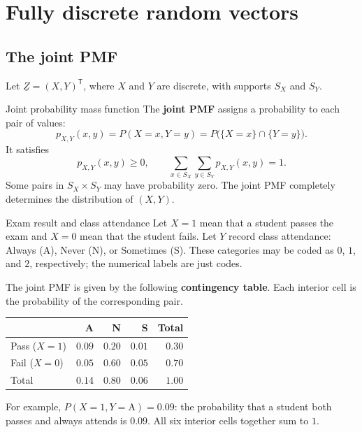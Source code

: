 \documentclass[a4paper,12pt,oneside]{report}
\begin{document}
\clearpage
\section{Fully discrete random vectors}
\label{sec:fully-discrete-random-vectors}

\subsection{The joint PMF}
\label{sec:joint-pmf}

Let $\underline{Z}=(X,Y)^{\mathsf T}$, where $X$ and $Y$ are discrete,
with supports $S_X$ and $S_Y$.

\begin{frameddefn}{Joint probability mass function}
The \textbf{joint PMF} assigns a probability to each pair of values:
\[
  p_{X,Y}(x,y)=P(X=x,Y=y)
    =P\bigl(\{X=x\}\cap\{Y=y\}\bigr).
\]
It satisfies
\[
  p_{X,Y}(x,y)\geq0,
  \qquad
  \sum_{x\in S_X}\sum_{y\in S_Y}p_{X,Y}(x,y)=1.
\]
Some pairs in $S_X\times S_Y$ may have probability zero.
The joint PMF completely determines the distribution of $(X,Y)$.
\end{frameddefn}

\begin{framedexample}{Exam result and class attendance}
Let $X=1$ mean that a student passes the exam and $X=0$ mean
that the student fails. Let $Y$ record class attendance:
Always (A), Never (N), or Sometimes (S).
These categories may be coded as $0$, $1$, and $2$, respectively;
the numerical labels are just codes.

The joint PMF is given by the following \textbf{contingency table}.
Each interior cell is the probability of the corresponding pair.
\begin{center}
\begin{tabular}{lrrrr}
\toprule
 & A & N & S & Total\\
\midrule
Pass ($X=1$) & $0.09$ & $0.20$ & $0.01$ & $0.30$\\
Fail ($X=0$) & $0.05$ & $0.60$ & $0.05$ & $0.70$\\
\midrule
Total & $0.14$ & $0.80$ & $0.06$ & $1.00$\\
\bottomrule
\end{tabular}
\end{center}
For example, $P(X=1,Y=\mathrm A)=0.09$: the probability that
a student both passes and always attends is $0.09$.
All six interior cells together sum to $1$.
\end{framedexample}
\end{document}
